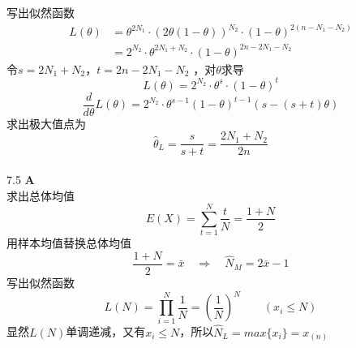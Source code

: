 \documentclass[a4paper]{ctexart}    %
\begin{document}
	写出似然函数
	\begin{equation*}
		\begin{split}
			L(\theta) &= \theta^{2N_1} \cdot (2\theta(1-\theta))^{N_2} \cdot (1-\theta)^{2(n-N_1-N_2)} \\
			&= 2^{N_2} \cdot \theta^{2N_1+N_2} \cdot (1-\theta)^{2n-2N_1-N_2}
		\end{split}
	\end{equation*}
	令$ s = 2N_1 + N_2 $，$ t = 2n - 2N_1 - N_2 $ ，对$ \theta $求导
	\begin{equation*}
		L(\theta) = 2^{N_2} \cdot \theta^{s} \cdot (1-\theta)^{t}
	\end{equation*}
	\begin{equation*}
		\frac{d}{d\theta}L(\theta) = 2^{N_2} \cdot \theta^{s-1}(1-\theta)^{t-1}(s-(s+t)\theta)
	\end{equation*}
	求出极大值点为
	\begin{equation*}
		\hat{\theta}_L = \frac{s}{s + t} = \frac{2N_1 + N_2}{2n}
	\end{equation*}
	\\
	7.5 \quad \textbf{A} \\
	求出总体均值
	\begin{equation*}
		E(X) = \sum\limits_{t=1}^{N} \frac{t}{N} = \frac{1+N}{2}
	\end{equation*}
	用样本均值替换总体均值
	\begin{equation*}
		\frac{1+N}{2} = \bar{x} \quad \Rightarrow \quad \hat{N}_M = 2\bar{x} - 1
	\end{equation*}
	写出似然函数
	\begin{equation*}
		L(N) = \prod\limits_{i=1}^{N} \frac{1}{N} = \left(\frac{1}{N}\right)^N \qquad (x_i \leq N)
	\end{equation*}
	显然$ L(N) $单调递减，又有$ x_i \leq N $，所以$ \hat{N}_L = max\{x_i\} = x_{(n)} $ \\ \\
\end{document}
